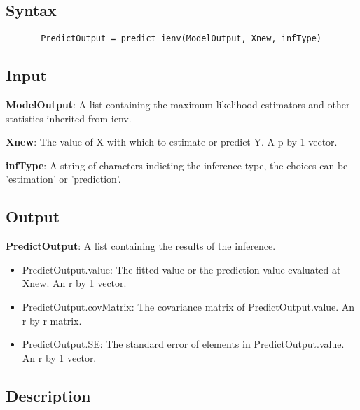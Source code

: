 \documentclass[a4paper,11pt,openany]{memoir}
\begin{document}
\subsection*{Syntax}


\begin{verbatim}       PredictOutput = predict_ienv(ModelOutput, Xnew, infType)\end{verbatim}
    

\subsection*{Input}

\begin{par}
\textbf{ModelOutput}: A list containing the maximum likelihood estimators and other statistics inherited from ienv.
\end{par} \vspace{1em}
\begin{par}
\textbf{Xnew}: The value of X with which to estimate or predict Y.  A p by 1 vector.
\end{par} \vspace{1em}
\begin{par}
\textbf{infType}: A string of characters indicting the inference type, the choices can be 'estimation' or 'prediction'.
\end{par} \vspace{1em}


\subsection*{Output}

\begin{par}
\textbf{PredictOutput}: A list containing the results of the inference.
\end{par} \vspace{1em}
\begin{itemize}
\setlength{\itemsep}{-1ex}
   \item PredictOutput.value: The fitted value or the prediction value evaluated at Xnew. An r by 1 vector.
   \item PredictOutput.covMatrix: The covariance matrix of PredictOutput.value. An r by r matrix.
   \item PredictOutput.SE: The standard error of elements in PredictOutput.value. An r by 1 vector.
\end{itemize}


\subsection*{Description}
\end{document}
